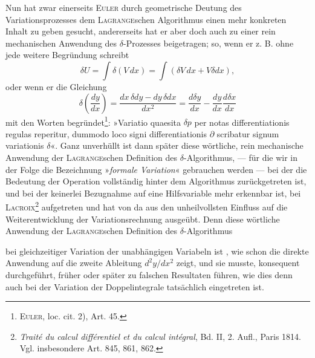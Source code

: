 Nun hat zwar einerseits \textsc{Euler} durch geometrische Deutung des Variationsprozesses
dem \textsc{Lagrange}schen Algorithmus einen mehr konkreten Inhalt zu
geben gesucht, andererseits hat er aber doch auch zu einer rein mechanischen
Anwendung des $\delta$-Prozesses beigetragen; so, wenn er z. B. ohne jede weitere
Begründung schreibt
\[
\delta U=\int\delta(V\,dx)=\int(\delta V\,dx+V\delta dx),
\]
oder wenn er die Gleichung
\[
\delta\left(\frac{dy}{dx}\right)=\frac{dx\,\delta dy-dy\,\delta dx}{dx^2}
=\frac{d\delta y}{dx}-\frac{dy}{dx}\frac{d\delta x}{dx}
\]
mit den Worten begründet\footnote{\textsc{Euler}, loc. cit. 2), Art. 45.}: »Variatio quaesita $\delta p$ per notas differentiationis
regulas reperitur, dummodo loco signi differentiationis $\partial$ scribatur signum variationis
$\delta$«. Ganz unverhüllt ist dann später diese wörtliche, rein mechanische
Anwendung der \textsc{Lagrange}schen Definition des $\delta$-Algorithmus, — für die wir
in der Folge die Bezeichnung »\textit{formale Variation}« gebrauchen werden — bei
der die Bedeutung der Operation vollständig hinter dem Algorithmus zurückgetreten
ist, und bei der keinerlei Bezugnahme auf eine Hilfsvariable mehr
erkennbar ist, bei \textsc{Lacroix}\footnote{\textit{Traité du calcul différentiel et du calcul intégral}, Bd. II, 2. Aufl., Paris 1814. Vgl. insbesondere Art. 845, 861, 862.} aufgetreten und hat von da aus den unheilvollsten
Einfluss auf die Weiterentwicklung der Variationsrechnung ausgeübt. Denn
diese wörtliche Anwendung der \textsc{Lagrange}schen Definition des $\delta$-Algorithmus
\par\clearpage{}
\noindent bei gleichzeitiger Variation der unabhängigen Variabeln ist , wie schon
die direkte Anwendung auf die zweite Ableitung $d^2y/dx^2$ zeigt, und sie musste,
konsequent durchgeführt, früher oder später zu falschen Resultaten führen,
wie dies denn auch bei der Variation der Doppelintegrale tatsächlich eingetreten
ist.
\par\clearpage\endgroup
